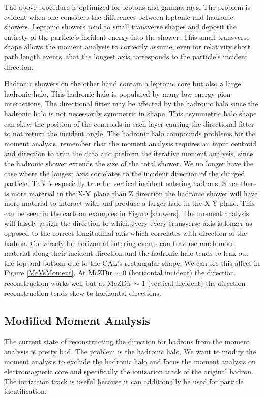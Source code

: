 \documentclass[11pt]{article}
\begin{document}
The above procedure is optimized for leptons and gamma-rays.  The problem is evident when one considers the differences between leptonic and hadronic showers.  Leptonic showers tend to small transverse shapes and deposit the entirety of the particle's incident energy into the shower.  This small transverse shape allows the moment analysis to correctly assume, even for relativity short path length events, that the longest axis corresponds to the particle's incident direction.  

Hadronic showers on the other hand contain a leptonic core but also a large hadronic halo.  This hadronic halo is populated by many low energy pion interactions.  The directional fitter may be affected by the hadronic halo since the hadronic halo is not necessarily symmetric in shape. This asymmetric halo shape can skew the position of the centroids in each layer causing the directional fitter to not return the incident angle.  The hadronic halo compounds problems for the moment analysis, remember that the moment analysis requires an input centroid and direction to trim the data and preform the iterative moment analysis, since the hadronic shower extends the size of the total shower.  We no longer have the case where the longest axis correlates to the incident direction of the charged particle.  This is especially true for vertical incident entering hadrons.  Since there is more material in the X-Y plane than Z direction the hadronic shower will have more material to interact with and produce a larger halo in the X-Y plane.  This can be seen in the cartoon examples in Figure \ref{showers}.  The moment analysis will falsely assign the direction to which every every transverse axis is longer as opposed to the correct longitudinal axis which correlates with direction of the hadron.  Conversely for horizontal entering events can traverse much more material along their incident direction and the hadronic halo tends to leak out the top and bottom  due to the CAL's rectangular shape.    We can see this affect in Figure \ref{McVsMoment}.  At McZDir $\sim$ 0 (horizontal incident) the direction reconstruction works well but at McZDir $\sim$ 1 (vertical incident) the direction reconstruction tends skew to horizontal directions.  

\subsection{Modified Moment Analysis}

The current state of reconstructing the direction for hadrons from the moment analysis is pretty bad.  The problem is the hadronic halo.  We want to modify the moment analysis to exclude the hadronic halo and focus the moment analysis on electromagnetic core and specifically the ionization track of the original hadron.  The ionization track is useful because it can additionally be used for particle identification.  
\end{document}
